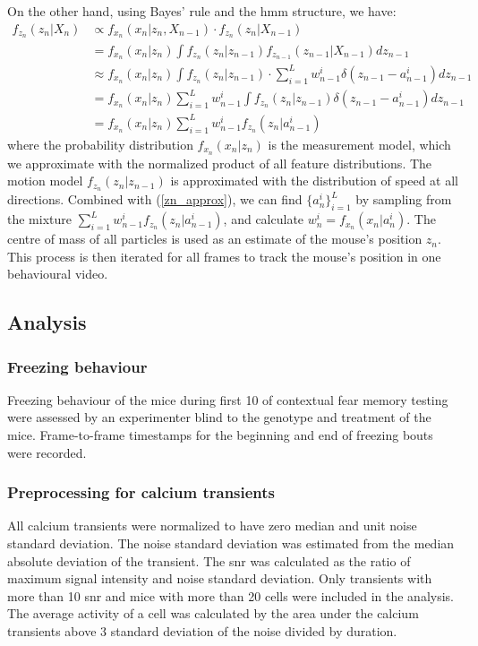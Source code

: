 On the other hand, using Bayes' rule and the \gls{hmm} structure, we have:
\begin{align*}
    f_{z_n}(z_n|X_n) &\propto f_{x_n}(x_n|z_n, X_{n-1}) \cdot f_{z_n}(z_n|X_{n-1}) \\
                     &= f_{x_n}(x_n|z_n) \int f_{z_n}(z_n|z_{n-1})f_{z_{n-1}}(z_{n-1}|X_{n-1})dz_{n-1}  \\
                     &\approx f_{x_n}(x_n|z_n) \int f_{z_n}(z_n|z_{n-1})\cdot \sum_{i=1}^Lw_{n-1}^i\delta(z_{n-1}-a_{n-1}^i)dz_{n-1} \\
                     &= f_{x_n}(x_n|z_n)  \sum_{i=1}^Lw_{n-1}^i \int f_{z_n}(z_n|z_{n-1})\delta(z_{n-1} - a_{n-1}^i)dz_{n-1} \\
                     &= f_{x_n}(x_n|z_n) \sum_{i=1}^Lw_{n-1}^if_{z_n}(z_n|a_{n-1}^i) 
\end{align*}
where the probability distribution $f_{x_n}(x_n|z_n)$ is the measurement model, which we approximate with the normalized product of all feature distributions. The motion model $f_{z_n}(z_n|z_{n-1})$ is approximated with the distribution of speed at all directions. Combined with (\ref{zn_approx}), we can find $\{a_n^i\}_{i=1}^L$ by sampling from the mixture $\sum_{i=1}^Lw_{n-1}^if_{z_n}(z_n|a_{n-1}^i)$, and calculate $w_n^i = f_{x_n}(x_n|a_n^i)$. The centre of mass of all particles is used as an estimate of the mouse's position $z_n$. This process is then iterated for all frames to track the mouse's position in one behavioural video.

\subsection{Analysis}

\subsubsection{Freezing behaviour}
Freezing behaviour of the mice during first \SI{10}{\min} of contextual fear memory testing were assessed by an experimenter blind to the genotype and treatment of the mice. Frame-to-frame timestamps for the beginning and end of freezing bouts were recorded.

\subsubsection{Preprocessing for calcium transients}

All calcium transients were normalized to have zero median and unit noise standard deviation. The noise standard deviation was estimated from the median absolute deviation of the transient. The \gls{snr} was calculated as the ratio of maximum signal intensity and noise standard deviation. Only transients with more than 10 \gls{snr} and mice with more than 20 cells were included in the analysis. The average activity of a cell was calculated by the area under the calcium transients above 3 standard deviation of the noise divided by duration.

